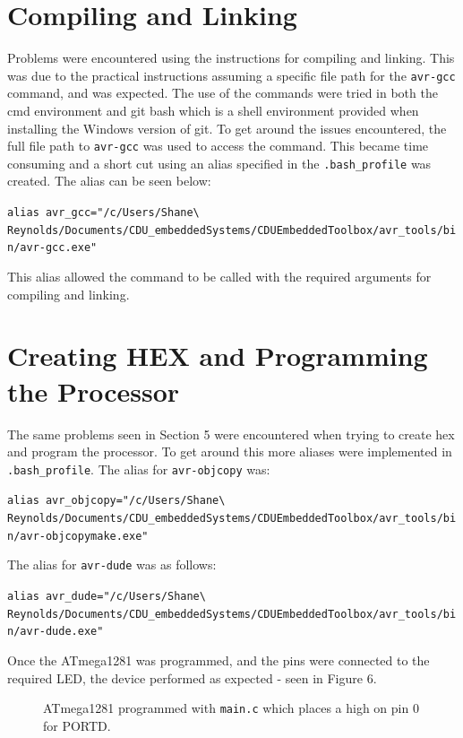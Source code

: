 \documentclass[a4paper]{article}
\begin{document}
\section{Compiling and Linking}
Problems were encountered using the instructions for compiling and linking. This was due to the practical instructions assuming a specific file path for the \verb|avr-gcc| command, and was expected. The use of the commands were tried in both the cmd environment and git bash which is a shell environment provided when installing the Windows version of git. To get around the issues encountered, the full file path to \verb|avr-gcc| was used to access the command. This became time consuming and a short cut using an alias specified in the \verb|.bash_profile| was created. The alias can be seen below:
\begin{center}
	\scriptsize\verb|alias avr_gcc="/c/Users/Shane\ Reynolds/Documents/CDU_embeddedSystems/CDUEmbeddedToolbox/avr_tools/bin/avr-gcc.exe"|
\end{center}


\normalsize This alias allowed the command to be called with the required arguments for compiling and linking.

\section{Creating HEX and Programming the Processor}
The same problems seen in Section 5 were encountered when trying to create hex and program the processor. To get around this more aliases were implemented in \verb|.bash_profile|. The alias for \verb|avr-objcopy| was:
\begin{center}
	\scriptsize\verb|alias avr_objcopy="/c/Users/Shane\ Reynolds/Documents/CDU_embeddedSystems/CDUEmbeddedToolbox/avr_tools/bin/avr-objcopymake.exe"|
\end{center}


The alias for \verb|avr-dude| was as follows:
\begin{center}
	\scriptsize\verb|alias avr_dude="/c/Users/Shane\ Reynolds/Documents/CDU_embeddedSystems/CDUEmbeddedToolbox/avr_tools/bin/avr-dude.exe"|
\end{center}

Once the ATmega1281 was programmed, and the pins were connected to the required LED, the device performed as expected - seen in Figure 6.

\begin{figure}[h]
	\centering
	\caption{ATmega1281 programmed with \texttt{main.c} which places a high on pin 0 for PORTD.}
\end{figure}
\end{document}
